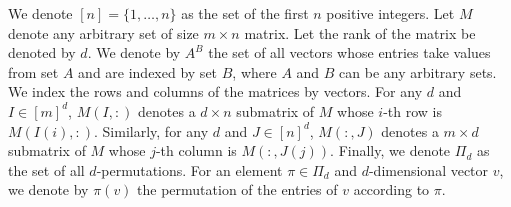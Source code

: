 
\newcommand{\transpose}{^\mathsf{\scriptscriptstyle T}}
We denote $[n] = \{1, \dots, n\}$ as the set of the first $n$ positive integers. Let $M$ denote any arbitrary set of size $m \times n$ matrix. Let the rank of the matrix be denoted by $d$. We denote by $A^B$ the set of all vectors whose entries take values from set $A$ and are indexed by set $B$, where $A$ and $B$ can be any arbitrary sets. We index the rows and columns of the matrices by vectors. For any $d$ and $I \in [m]^d$, $M(I, :)$ denotes a $d \times n$ submatrix of $M$ whose $i$-th row is $M(I(i), :)$. Similarly, for any $d$ and $J \in [n]^d$, $M(:, J)$ denotes a $m \times d$ submatrix of $M$ whose $j$-th column is $M(:, J(j))$. Finally, we denote $\Pi_d$ as the set of all $d$-permutations. For an element $\pi \in \Pi_d$ and $d$-dimensional vector $v$, we denote by $\pi(v)$ the permutation of the entries of $v$ according to $\pi$.



